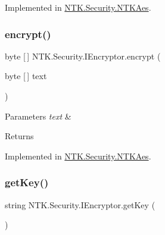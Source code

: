 Implemented in \mbox{\hyperlink{class_n_t_k_1_1_security_1_1_n_t_k_aes_aafd754f5643c47dc53dfbf7d482556ce}{N\+T\+K.\+Security.\+N\+T\+K\+Aes}}.

\mbox{\label{interface_n_t_k_1_1_security_1_1_i_encryptor_a6a993afc13699a6dcdedcdb092fbbea4}} 
\subsubsection{\texorpdfstring{encrypt()}{encrypt()}\hspace{0.1cm}{\footnotesize\ttfamily [2/2]}}
{\footnotesize\ttfamily byte \mbox{[}$\,$\mbox{]} N\+T\+K.\+Security.\+I\+Encryptor.\+encrypt (\begin{DoxyParamCaption}\item[{byte \mbox{[}$\,$\mbox{]}}]{text }\end{DoxyParamCaption})}






\begin{DoxyParams}{Parameters}
{\em text} & \\
\hline
\end{DoxyParams}
\begin{DoxyReturn}{Returns}

\end{DoxyReturn}


Implemented in \mbox{\hyperlink{class_n_t_k_1_1_security_1_1_n_t_k_aes_ad9da3eba89f2724ebe54e63086cee810}{N\+T\+K.\+Security.\+N\+T\+K\+Aes}}.

\mbox{\label{interface_n_t_k_1_1_security_1_1_i_encryptor_a8e93c4114dd5cb6510465381a7fe3228}} 
\subsubsection{\texorpdfstring{getKey()}{getKey()}}
{\footnotesize\ttfamily string N\+T\+K.\+Security.\+I\+Encryptor.\+get\+Key (\begin{DoxyParamCaption}{ }\end{DoxyParamCaption})}





